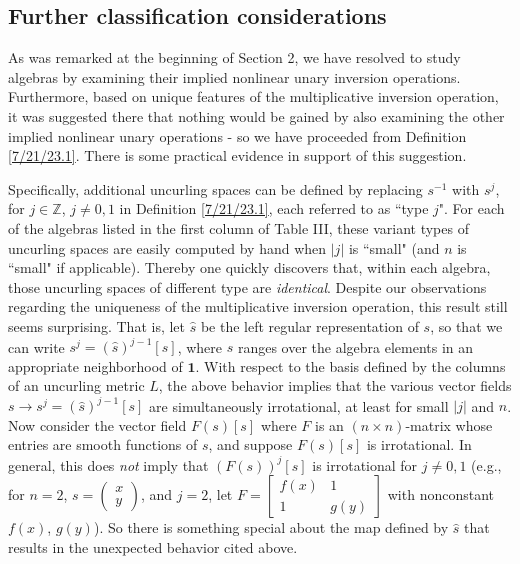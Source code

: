\documentclass{amsart}
\numberwithin{equation}{section}
\theoremstyle{definition}
\numberwithin{theorem}{section}
\begin{document}
\subsection{Further classification considerations} As was remarked at the beginning of Section 2, we have resolved to study algebras by examining their implied nonlinear unary inversion operations.  Furthermore, based on unique features of the multiplicative inversion operation, it was suggested there that nothing would be gained by also examining the other implied nonlinear unary operations - so we have proceeded from Definition \ref{7/21/23.1}.  
There is some practical evidence in support of this suggestion.
 
  Specifically, additional uncurling spaces can be defined by replacing $s^{-1}$ with $s^j$, for $j\in\mathbb{Z}$, $j\ne 0,1$ in Definition \ref{7/21/23.1}, each referred to as ``type $j$".  For each of the algebras listed in the first column of Table III, these variant types of uncurling spaces are easily computed by hand when  $|j|$ is ``small" (and $n$ is ``small" if applicable).  
Thereby one quickly discovers that, within each algebra, those uncurling spaces of different type are {\it identical}.  Despite our observations regarding the uniqueness of the multiplicative inversion operation, this result still seems surprising.  That is, let $\hat{s}$ be the left regular representation of $s$, so that we can write $s^j = (\hat{s})^{j-1}[s]$, where $s$ ranges over the algebra elements in an appropriate neighborhood of $\mathbf{1}$. With respect to the basis defined by the columns of an uncurling metric $L$, the above behavior implies that the various vector fields $s\rightarrow s^j = (\hat{s})^{j-1}[s]$ are simultaneously irrotational, at least for small $|j|$ and $n$.  Now consider the vector field $F(s)[s]$ where $F$ is an \mbox{$(n\times n)$-matrix} whose entries are smooth functions of $s$, and suppose $F(s)[s]$ is \mbox{irrotational}.  In general, this does {\it not} imply that $(F(s))^j[s]$ is irrotational for $j\ne 0,1$ (e.g., for \mbox{$n=2$}, $s=\left(\begin{array}{ccc}
 x   \\ 
y    
\end{array}\right)$, and $j=2$, let $F= \left[\begin{array}{ccc}
 f(x) & 1   \\ 
 1 & g(y)    
\end{array}\right]$ with nonconstant $f(x)$, $g(y)$).  So there is something special about the map defined by $\hat{s}$ that results in the unexpected behavior cited above. 
\end{document}
